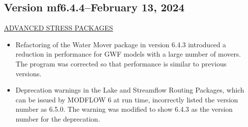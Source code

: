 	
	\subsection{Version mf6.4.4--February 13, 2024}
	





	\underline{ADVANCED STRESS PACKAGES}
	\begin{itemize}
		\item Refactoring of the Water Mover package in version 6.4.3 introduced a reduction in performance for GWF models with a large number of movers.  The program was corrected so that performance is similar to previous versions.
		\item Deprecation warnings in the Lake and Streamflow Routing Packages, which can be issued by MODFLOW 6 at run time, incorrectly listed the version number as 6.5.0.  The warning was modified to show 6.4.3 as the version number for the deprecation.
	\end{itemize}

